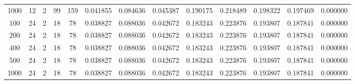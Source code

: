 \begin{table}[h]
\begin{tabular}{ccccccccccccc}
1000 & 12 & 2 & 99 & 159 & 0.041855 & 0.084636 & 0.045387 & 0.190175 & 0.218489 & 0.198322 & 0.197469 & 0.000000 \\
100 & 24 & 2 & 18 & 78 & 0.038827 & 0.088036 & 0.042672 & 0.183243 & 0.223876 & 0.193807 & 0.187841 & 0.000000 \\
200 & 24 & 2 & 18 & 78 & 0.038827 & 0.088036 & 0.042672 & 0.183243 & 0.223876 & 0.193807 & 0.187841 & 0.000000 \\
400 & 24 & 2 & 18 & 78 & 0.038827 & 0.088036 & 0.042672 & 0.183243 & 0.223876 & 0.193807 & 0.187841 & 0.000000 \\
500 & 24 & 2 & 18 & 78 & 0.038827 & 0.088036 & 0.042672 & 0.183243 & 0.223876 & 0.193807 & 0.187841 & 0.000000 \\
1000 & 24 & 2 & 18 & 78 & 0.038827 & 0.088036 & 0.042672 & 0.183243 & 0.223876 & 0.193807 & 0.187841 & 0.000000 \\
\bottomrule
\end{tabular}
\end{table}
